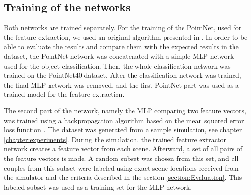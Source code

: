 \subsection{Training of the networks}\label{section:nnTraining}

Both networks are trained separately. For the training of the PointNet, used for the feature extraction, we used an original algorithm presented in \cite{PointNet}. In order to be able to evaluate the results and compare them with the expected results in the dataset, the PointNet network was concatenated with a simple MLP network used for the object classification. Then, the whole classification network was trained on the PointNet40 \cite{PointNet40} dataset. After the classification network was trained, the final MLP network was removed, and the first PointNet part was used as a trained model for the feature extraction.\par
The second part of the network, namely the MLP comparing two feature vectors, was trained using a backpropagation algorithm \cite{backPropagation} based on the mean squared error loss function \cite{MSELoss}. The dataset was generated from a sample simulation, see chapter \ref{chapter:experiments}. During the simulation, the trained feature extractor network creates a feature vector from each scene. Afterward, a set of all pairs of the feature vectors is made. A random subset was chosen from this set, and all couples from this subset were labeled using exact scene locations received from the simulator and the criteria described in the section \ref{section:Evaluation}. This labeled subset was used as a training set for the MLP network.

